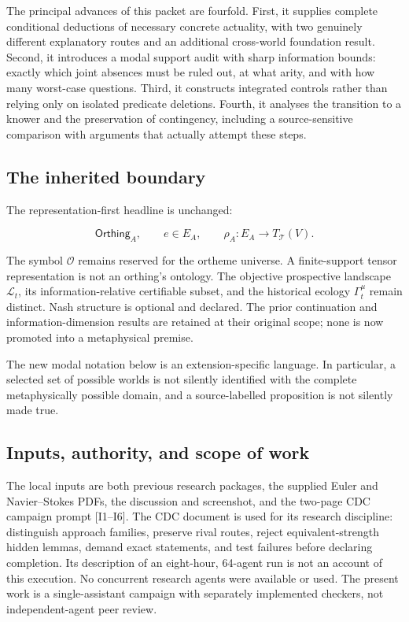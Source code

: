 \documentclass[11pt,a4paper]{article}
\begin{document}
The principal advances of this packet are fourfold. First, it supplies
complete conditional deductions of necessary concrete actuality, with
two genuinely different explanatory routes and an additional cross-world
foundation result. Second, it introduces a modal support audit with
sharp information bounds: exactly which joint absences must be ruled
out, at what arity, and with how many worst-case questions. Third, it
constructs integrated controls rather than relying only on isolated
predicate deletions. Fourth, it analyses the transition to a knower and
the preservation of contingency, including a source-sensitive comparison
with arguments that actually attempt these steps.

\subsection{The inherited boundary}\label{the-inherited-boundary}

The representation-first headline is unchanged:

\nopagebreak[4]

\[
\mathsf{Orthing}_A,\qquad e\in E_A,\qquad
\rho_A:E_A\longrightarrow T_{\mathcal T}(V).
\]

The symbol \(\mathcal O\) remains reserved for the ortheme universe. A
finite-support tensor representation is not an orthing's ontology. The
objective prospective landscape \(\mathcal L_t\), its
information-relative certifiable subset, and the historical ecology
\(\Gamma_t^\mu\) remain distinct. Nash structure is optional and
declared. The prior continuation and information-dimension results are
retained at their original scope; none is now promoted into a
metaphysical premise.

The new modal notation below is an extension-specific language. In
particular, a selected set of possible worlds is not silently identified
with the complete metaphysically possible domain, and a source-labelled
proposition is not silently made true.

\subsection{Inputs, authority, and scope of
work}\label{inputs-authority-and-scope-of-work}

The local inputs are both previous research packages, the supplied Euler
and Navier--Stokes PDFs, the discussion and screenshot, and the two-page
CDC campaign prompt {[}I1--I6{]}. The CDC document is used for its
research discipline: distinguish approach families, preserve rival
routes, reject equivalent-strength hidden lemmas, demand exact
statements, and test failures before declaring completion. Its
description of an eight-hour, 64-agent run is not an account of this
execution. No concurrent research agents were available or used. The
present work is a single-assistant campaign with separately implemented
checkers, not independent-agent peer review.
\end{document}
